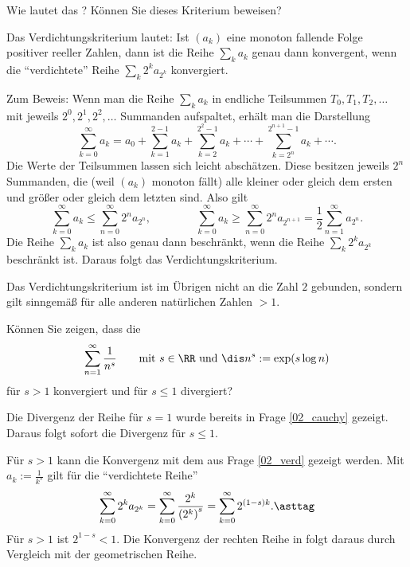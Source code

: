\begin{frage}
  \label{02_verd}
  Wie lautet das ? Können Sie dieses 
  Kriterium beweisen?
\end{frage}

\begin{antwort}
  Das Verdichtungskriterium lautet: 
  Ist $(a_k)$ eine monoton fallende Folge positiver reeller Zahlen, 
  dann ist die Reihe $\sum_k a_k$ genau dann 
  konvergent, wenn die "`verdichtete"' Reihe 
  $\sum_k 2^k a_{2^k}$ konvergiert.

  Zum Beweis: Wenn man die Reihe $\sum_k a_k$ in 
  endliche Teilsummen $T_0, T_1, T_2,\ldots$ 
  mit jeweils $2^0, 2^1, 2^2, \ldots$ 
  Summanden aufspaltet, erhält man die Darstellung
  \[
  \sum_{k=0}^\infty a_k = 
  a_0 + 
  \sum_{k=1}^{2-1} a_k +  
  \sum_{k=2}^{2^2-1} a_k + \cdots + 
  \sum_{k=2^n}^{2^{n+1}-1} a_k + \cdots. 
  \]     
  Die Werte der Teilsummen lassen sich leicht abschätzen. Diese 
  besitzen jeweils $2^n$ Summanden, die 
  (weil $(a_k)$ monoton fällt) alle kleiner oder gleich 
  dem ersten und größer oder gleich 
  dem letzten sind. Also gilt 
  \[
  \sum_{k=0}^\infty a_k \le \sum_{n=0}^\infty 2^n a_{2^n},
  \qquad\qquad 
  \sum_{k=0}^\infty a_k 
  \ge \sum_{n=0}^\infty 2^n a_{2^{n+1}} = \frac{1}{2}\label{02_besc}
  \sum_{n=1}^\infty a_{2^n}.
  \]
  Die Reihe $\sum_k a_k$ ist also genau dann beschränkt, 
  wenn die Reihe $\sum_k 2^k a_{2^k}$ beschränkt ist. 
  Daraus folgt das Verdichtungskriterium.

  Das Verdichtungskriterium ist im Übrigen nicht an die Zahl $2$ gebunden, 
  sondern gilt sinngemäß für alle anderen natürlichen Zahlen $>1$.
  \AntEnd
\end{antwort}

\begin{frage}\label{03_harm}
  Können Sie zeigen, 
  dass die 
  \[
  \sum_{n=1}^\infty \frac{1}{n^s}\qquad  \text{mit $s \in \RR$ und 
    $\dis n^s := \exp( s\log n )$}  
  \]
  für $s>1$ konvergiert und für $s\le 1$ divergiert?
\end{frage}

\begin{antwort}
  Die Divergenz der Reihe für $s=1$ wurde bereits 
  in Frage \ref{02_cauchy} gezeigt. Daraus folgt sofort die 
  Divergenz für $s\le 1$. 

  Für $s>1$ kann die Konvergenz mit dem  aus 
  Frage \ref{02_verd} gezeigt werden. Mit $a_k := \frac{1}{k^s}$ gilt
  für die "`verdichtete Reihe"' 
  \[
  \sum_{k=0}^\infty 2^k a_{2^k} = \sum_{k=0}^\infty \frac{2^k}{{(2^k)}^s}
  =\sum_{k=0}^\infty 2^{(1-s)k}. \asttag
  \]
  Für $s>1$ ist $2^{1-s}<1$. Die Konvergenz 
  der rechten Reihe in {\astref} folgt daraus durch Vergleich mit 
  der geometrischen Reihe. \AntEnd
\end{antwort}


